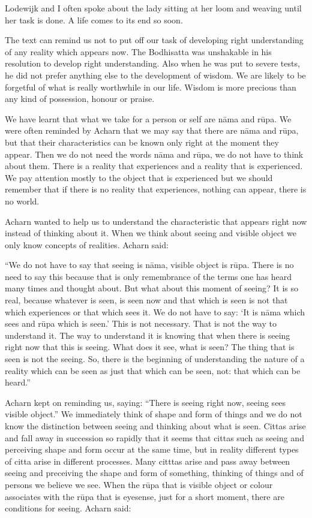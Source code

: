 Lodewijk and I often spoke about the lady sitting at her loom and
weaving until her task is done. A life comes to its end so soon.

The text can remind us not to put off our task of developing right
understanding of any reality which appears now. The Bodhisatta was
unshakable in his resolution to develop right understanding. Also when
he was put to severe tests, he did not prefer anything else to the
development of wisdom. We are likely to be forgetful of what is really
worthwhile in our life. Wisdom is more precious than any kind of
possession, honour or praise.

We have learnt that what we take for a person or self are nāma and rūpa.
We were often reminded by Acharn that we may say that there are nāma and
rūpa, but that their characteristics can be known only right at the
moment they appear. Then we do not need the words nāma and rūpa, we do
not have to think about them. There is a reality that experiences and a
reality that is experienced. We pay attention mostly to the object that
is experienced but we should remember that if there is no reality that
experiences, nothing can appear, there is no world.

Acharn wanted to help us to understand the characteristic that appears
right now instead of thinking about it. When we think about seeing and
visible object we only know concepts of realities. Acharn said:

``We do not have to say that seeing is nāma, visible object is rūpa.
There is no need to say this because that is only remembrance of the
terms one has heard many times and thought about. But what about this
moment of seeing? It is so real, because whatever is seen, is seen now
and that which is seen is not that which experiences or that which sees
it. We do not have to say: `It is nāma which sees and rūpa which is
seen.' This is not necessary. That is not the way to understand it. The
way to understand it is knowing that when there is seeing right now that
this is seeing. What does it see, what is seen? The thing that is seen
is not the seeing. So, there is the beginning of understanding the nature of a reality which can be seen as just that which can be seen, not:
that which can be heard.''

Acharn kept on reminding us, saying: ``There is seeing right now, seeing
sees visible object.'' We immediately think of shape and form of things
and we do not know the distinction between seeing and thinking about
what is seen. Cittas arise and fall away in succession so rapidly that
it seems that cittas such as seeing and perceiving shape and form occur
at the same time, but in reality different types of citta arise in
different processes. Many citttas arise and pass away between seeing and
preceiving the shape and form of something, thinking of things and of
persons we believe we see. When the rūpa that is visible object or
colour associates with the rūpa that is eyesense, just for a short
moment, there are conditions for seeing. Acharn said:

